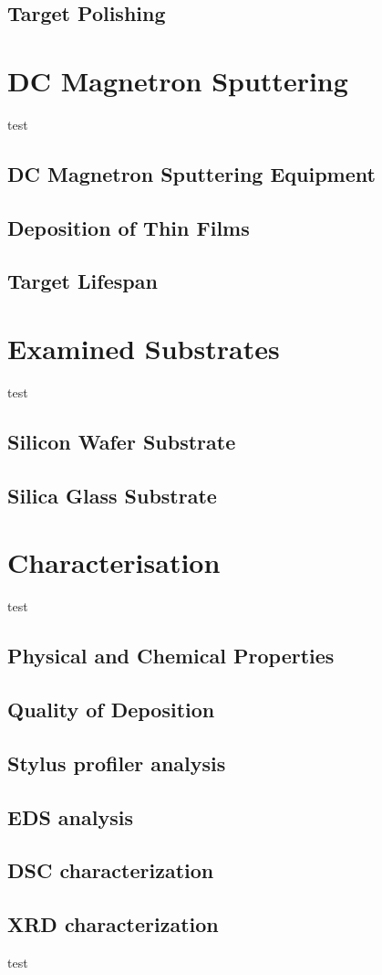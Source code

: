\documentclass[a4paper,12pt,oneside]{report}%
\begin{document}
\subsection{Target Polishing}

\section{DC Magnetron Sputtering}
test
\subsection{DC Magnetron Sputtering Equipment}

\subsection{Deposition of Thin Films}

\subsection{Target Lifespan}

\section{Examined Substrates} 
test
\subsection{Silicon Wafer Substrate}

\subsection{Silica Glass Substrate}

\section{Characterisation}
test
\subsection{Physical and Chemical Properties}

\subsection{Quality of Deposition} 
 
\subsection{Stylus profiler analysis}

\subsection{EDS analysis}

\subsection{DSC characterization}

\subsection{XRD characterization}
test
\end{document}
